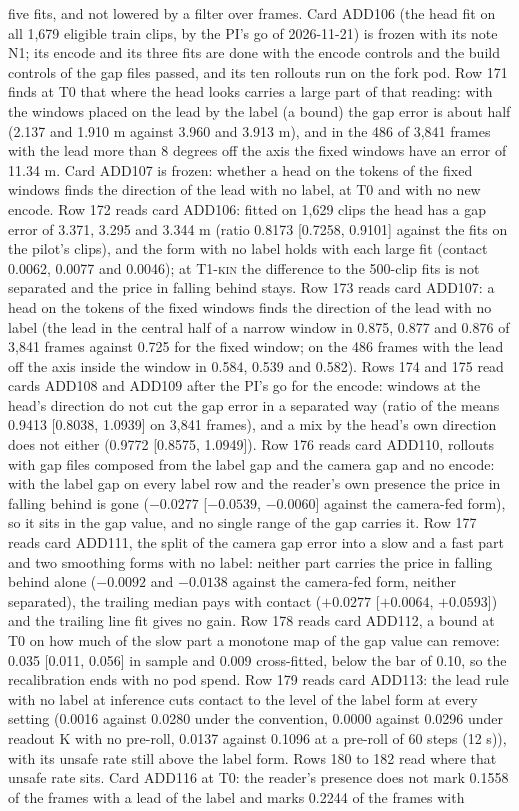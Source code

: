 \documentclass[10pt,twocolumn]{article}
\theoremstyle{remark}
\newcommand{\tier}[1]{\textsc{\small #1}}
\begin{document}
five fits, and not lowered by a filter over frames. Card ADD106 (the head fit on all 1,679 eligible train clips, by the PI's go of 2026-11-21) is frozen with its note N1; its encode and its three fits are done with the encode controls and the build controls of the gap files passed, and its ten rollouts run on the fork pod. Row 171 finds at \tier{T0} that where the head looks carries a large part of that reading: with the windows placed on the lead by the label (a bound) the gap error is about half (2.137 and 1.910 m against 3.960 and 3.913 m), and in the 486 of 3,841 frames with the lead more than 8 degrees off the axis the fixed windows have an error of 11.34 m. Card ADD107 is frozen: whether a head on the tokens of the fixed windows finds the direction of the lead with no label, at \tier{T0} and with no new encode. Row 172 reads card ADD106: fitted on 1,629 clips the head has a gap error of 3.371, 3.295 and 3.344 m (ratio 0.8173 [0.7258, 0.9101] against the fits on the pilot's clips), and the form with no label holds with each large fit (contact 0.0062, 0.0077 and 0.0046); at \tier{T1-kin} the difference to the 500-clip fits is not separated and the price in falling behind stays. Row 173 reads card ADD107: a head on the tokens of the fixed windows finds the direction of the lead with no label (the lead in the central half of a narrow window in 0.875, 0.877 and 0.876 of 3,841 frames against 0.725 for the fixed window; on the 486 frames with the lead off the axis inside the window in 0.584, 0.539 and 0.582). Rows 174 and 175 read cards ADD108 and ADD109 after the PI's go for the encode: windows at the head's direction do not cut the gap error in a separated way (ratio of the means 0.9413 [0.8038, 1.0939] on 3,841 frames), and a mix by the head's own direction does not either (0.9772 [0.8575, 1.0949]). Row 176 reads card ADD110, rollouts with gap files composed from the label gap and the camera gap and no encode: with the label gap on every label row and the reader's own presence the price in falling behind is gone ($-0.0277$ [$-0.0539$, $-0.0060$] against the camera-fed form), so it sits in the gap value, and no single range of the gap carries it. Row 177 reads card ADD111, the split of the camera gap error into a slow and a fast part and two smoothing forms with no label: neither part carries the price in falling behind alone ($-0.0092$ and $-0.0138$ against the camera-fed form, neither separated), the trailing median pays with contact ($+0.0277$ [$+0.0064$, $+0.0593$]) and the trailing line fit gives no gain. Row 178 reads card ADD112, a bound at \tier{T0} on how much of the slow part a monotone map of the gap value can remove: 0.035 [0.011, 0.056] in sample and 0.009 cross-fitted, below the bar of 0.10, so the recalibration ends with no pod spend. Row 179 reads card ADD113: the lead rule with no label at inference cuts contact to the level of the label form at every setting (0.0016 against 0.0280 under the convention, 0.0000 against 0.0296 under readout K with no pre-roll, 0.0137 against 0.1096 at a pre-roll of 60 steps (12 s)), with its unsafe rate still above the label form. Rows 180 to 182 read where that unsafe rate sits. Card ADD116 at \tier{T0}: the reader's presence does not mark 0.1558 of the frames with a lead of the label and marks 0.2244 of the frames with 
\end{document}
